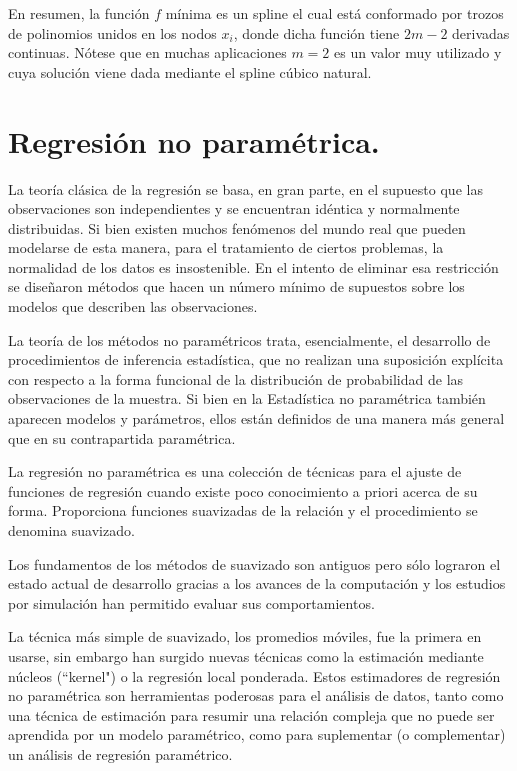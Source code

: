 \hspace{0.4cm} En resumen, la funci\'on $f$ m\'inima es un spline el cual est\'a conformado por trozos de polinomios unidos en los nodos $x_{i}$, donde dicha funci\'on tiene $2m-2$ derivadas continuas. N\'otese que en muchas aplicaciones $m=2$ es un valor muy utilizado y cuya soluci\'on viene dada mediante el spline c\'ubico natural.

\section{Regresi\'on no param\'etrica.}

\hspace{0.4cm} La teor\'ia cl\'asica de la regresi\'on se basa, en gran parte, en el supuesto que las observaciones son independientes y se encuentran id\'entica y normalmente distribuidas. Si bien existen muchos fen\'omenos del mundo real que pueden modelarse de esta manera, para el tratamiento de ciertos problemas, la normalidad de los datos es insostenible. En el intento de eliminar esa restricci\'on se dise\~naron m\'etodos que hacen un n\'umero m\'inimo de supuestos sobre los modelos que describen las observaciones.

\hspace{0.4cm} La teor\'ia de los m\'etodos no param\'etricos trata, esencialmente, el desarrollo de procedimientos de inferencia estad\'istica, que no realizan una suposici\'on expl\'icita con respecto a la forma funcional de la 
distribuci\'on de probabilidad de las observaciones de la muestra. Si bien en la Estad\'istica no param\'etrica tambi\'en aparecen modelos y par\'ametros, ellos est\'an definidos de una manera m\'as general que en su contrapartida param\'etrica.

\hspace{0.4cm}La regresi\'on no param\'etrica es una colecci\'on de t\'ecnicas para el ajuste de funciones de regresi\'on cuando existe poco conocimiento a priori acerca de su forma. Proporciona funciones suavizadas de la relaci\'on y el procedimiento se denomina suavizado.

\hspace{0.4cm}Los fundamentos de los m\'etodos de suavizado son antiguos pero s\'olo lograron el estado actual de desarrollo gracias a los avances de la computaci\'on y los estudios por simulaci\'on han permitido evaluar sus comportamientos.

\hspace{0.4cm} La t\'ecnica m\'as simple de suavizado, los promedios m\'oviles, fue la primera en usarse, sin embargo han surgido nuevas t\'ecnicas como la estimaci\'on mediante n\'ucleos (``kernel") o la regresi\'on local ponderada. Estos estimadores de regresi\'on no param\'etrica son herramientas poderosas para el an\'alisis de datos, tanto como una t\'ecnica de estimaci\'on para resumir una relaci\'on compleja que no puede ser aprendida por un modelo param\'etrico, como para suplementar (o complementar) un an\'alisis de regresi\'on param\'etrico.

